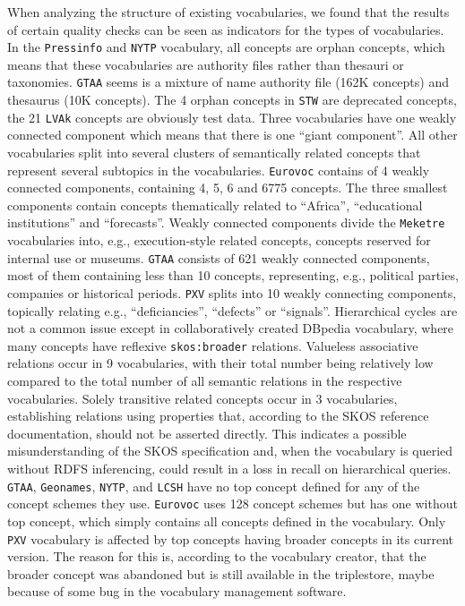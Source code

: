 When analyzing the structure of existing vocabularies, we found that the results of certain quality checks can be seen as indicators for the types of vocabularies.
In the \texttt{Pressinfo} and \texttt{NYTP} vocabulary, all concepts are orphan concepts, which means that these vocabularies are authority files rather than thesauri or taxonomies. \texttt{GTAA} seems is a mixture of name authority file (162K concepts) and thesaurus (10K concepts). The 4 orphan concepts in \texttt{STW} are deprecated concepts, the 21 \texttt{LVAk} concepts are obviously test data.
Three vocabularies have one weakly connected component which means that there is one ``giant component''. All other vocabularies split into several clusters of semantically related concepts that represent several subtopics in the vocabularies. \texttt{Eurovoc} contains of 4 weakly connected components, containing 4, 5, 6 and 6775 concepts. The three smallest components contain concepts thematically related to ``Africa'', ``educational institutions'' and ``forecasts''. Weakly connected components divide the \texttt{Meketre} vocabularies into, e.g., execution-style related concepts, concepts reserved for internal use or museums. \texttt{GTAA} consists of 621 weakly connected components, most of them containing less than 10 concepts, representing, e.g., political parties, companies or historical periods. \texttt{PXV} splits into 10 weakly connecting components, topically relating e.g., ``deficiancies'', ``defects'' or ``signals''.
Hierarchical cycles are not a common issue except in collaboratively created DBpedia vocabulary, where many concepts have reflexive \texttt{skos:broader} relations.
Valueless associative relations occur in 9 vocabularies, with their total number being relatively low compared to the total number of all semantic relations in the respective vocabularies.
Solely transitive related concepts occur in 3 vocabularies, establishing relations using properties that, according to the SKOS reference documentation, should not be asserted directly. This indicates a possible misunderstanding of the SKOS specification and, when the vocabulary is queried without RDFS inferencing, could result in a loss in recall on hierarchical queries.
\texttt{GTAA}, \texttt{Geonames}, \texttt{NYTP}, and \texttt{LCSH} have no top concept defined for any of the concept schemes they use. \texttt{Eurovoc} uses 128 concept schemes but has one without top concept, which simply contains all concepts defined in the vocabulary.
Only \texttt{PXV} vocabulary is affected by top concepts having broader concepts in its current version. The reason for this is, according to the vocabulary creator, that the broader concept was abandoned but is still available in the triplestore, maybe because of some bug in the vocabulary management software.

